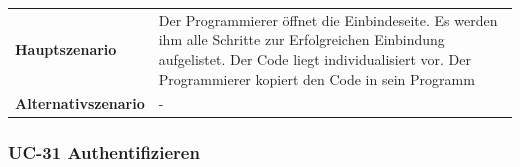 \begin{longtable}[c]{@{}ll@{}}
\begin{minipage}[t]{0.34\columnwidth}\raggedright\strut
\textbf{Hauptszenario}
\strut\end{minipage} &
\begin{minipage}[t]{0.60\columnwidth}\raggedright\strut
Der Programmierer öffnet die Einbindeseite. Es werden ihm alle Schritte
zur Erfolgreichen Einbindung aufgelistet. Der Code liegt
individualisiert vor. Der Programmierer kopiert den Code in sein
Programm
\strut\end{minipage}\tabularnewline
\begin{minipage}[t]{0.34\columnwidth}\raggedright\strut
\textbf{Alternativszenario}
\strut\end{minipage} &
\begin{minipage}[t]{0.60\columnwidth}\raggedright\strut
-
\strut\end{minipage}\tabularnewline
\bottomrule
\end{longtable}

\subsubsection{UC-31 Authentifizieren}\label{uc-31-authentifizieren}

